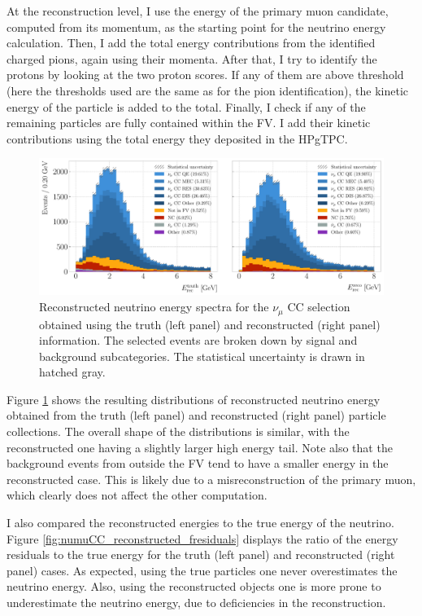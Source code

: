 At the reconstruction level, I use the energy of the primary muon candidate, computed from its momentum, as the starting point for the neutrino energy calculation. Then, I add the total energy contributions from the identified charged pions, again using their momenta. After that, I try to identify the protons by looking at the two proton scores. If any of them are above threshold (here the thresholds used are the same as for the pion identification), the kinetic energy of the particle is added to the total. Finally, I check if any of the remaining particles are fully contained within the FV. I add their kinetic contributions using the total energy they deposited in the HPgTPC.

\begin{figure}[t]
    \centering
    \includegraphics[width=.99\linewidth]{Images/GAr_selection/numuCC_selection_reco_energy_comparison.pdf}
    \caption[Reconstructed neutrino energy spectra for the $\nu_{\mu}$ CC selection obtained using the truth and reconstructed information]{Reconstructed neutrino energy spectra for the $\nu_{\mu}$ CC selection obtained using the truth (left panel) and reconstructed (right panel) information. The selected events are broken down by signal and background subcategories. The statistical uncertainty is drawn in hatched gray.}
    \label{fig:numuCC_reconstructed_energy}
\end{figure}

Figure \ref{fig:numuCC_reconstructed_energy} shows the resulting distributions of reconstructed neutrino energy obtained from the truth (left panel) and reconstructed (right panel) particle collections. The overall shape of the distributions is similar, with the reconstructed one having a slightly larger high energy tail. Note also that the background events from outside the FV tend to have a smaller energy in the reconstructed case. This is likely due to a misreconstruction of the primary muon, which clearly does not affect the other computation.

I also compared the reconstructed energies to the true energy of the neutrino. Figure \ref{fig:numuCC_reconstructed_fresiduals} displays the ratio of the energy residuals to the true energy for the truth (left panel) and reconstructed (right panel) cases. As expected, using the true particles one never overestimates the neutrino energy. Also, using the reconstructed objects one is more prone to underestimate the neutrino energy, due to deficiencies in the reconstruction.

